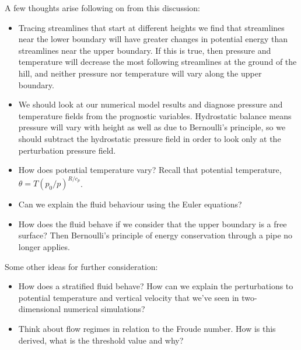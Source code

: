 \documentclass{article}
\begin{document}
A few thoughts arise following on from this discussion:
\begin{itemize}
	\item Tracing streamlines that start at different heights we find that streamlines near the lower boundary will have greater changes in potential energy than streamlines near the upper boundary.  If this is true, then pressure and temperature will decrease the most following streamlines at the ground of the hill, and neither pressure nor temperature will vary along the upper boundary.
	\item We should look at our numerical model results and diagnose pressure and temperature fields from the prognostic variables.  Hydrostatic balance means pressure will vary with height as well as due to Bernoulli's principle, so we should subtract the hydrostatic pressure field in order to look only at the perturbation pressure field.
	\item How does potential temperature vary?  Recall that potential temperature, $\theta = T \left( p_0 / p \right)^{R/c_p}$.
	\item Can we explain the fluid behaviour using the Euler equations?
	\item How does the fluid behave if we consider that the upper boundary is a free surface?  Then Bernoulli's principle of energy conservation through a pipe no longer applies.
\end{itemize}
Some other ideas for further consideration:
\begin{itemize}
	\item How does a stratified fluid behave?  How can we explain the perturbations to potential temperature and vertical velocity that we've seen in two-dimensional numerical simulations?
	\item Think about flow regimes in relation to the Froude number.  How is this derived, what is the threshold value and why?
\end{itemize}




\end{document}
